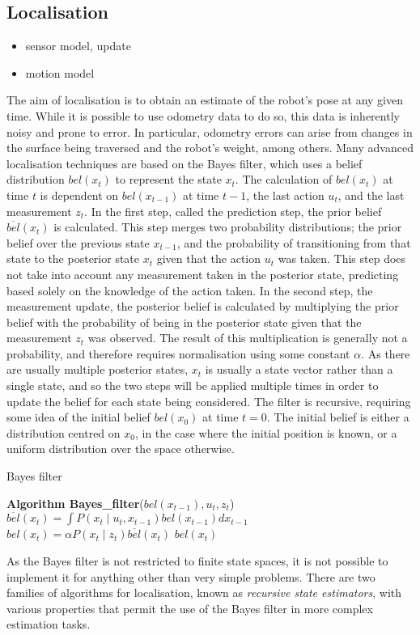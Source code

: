 \documentclass[conference]{IEEEtran}
\begin{document}
\subsection{Localisation}
\begin{itemize}
\item sensor model, update
\item motion model
\end{itemize}
The aim of localisation is to obtain an estimate of the robot's pose at any given time. While it is possible to use odometry data to do so, this data is inherently noisy and prone to error. In particular, odometry errors can arise from changes in the surface being traversed and the robot's weight, among others. Many advanced localisation techniques are based on the Bayes filter, which uses a belief distribution $bel(x_t)$ to represent the state $x_t$. The calculation of $bel(x_t)$ at time $t$ is dependent on $bel(x_{t-1})$ at time $t-1$, the last action $u_t$, and the last measurement $z_t$. In the first step, called the prediction step, the prior belief $\overline{bel}(x_t)$ is calculated. This step merges two probability distributions; the prior belief over the previous state $x_{t-1}$, and the probability of transitioning from that state to the posterior state $x_t$ given that the action $u_t$ was taken. This step does not take into account any measurement taken in the posterior state, predicting based solely on the knowledge of the action taken. In the second step, the measurement update, the posterior belief is calculated by multiplying the prior belief with the probability of being in the posterior state given that the measurement $z_t$ was observed. The result of this multiplication is generally not a probability, and therefore requires normalisation using some constant $\alpha$. As there are usually multiple posterior states, $x_t$ is usually a state vector rather than a single state, and so the two steps will be applied multiple times in order to update the belief for each state being considered. The filter is recursive, requiring some idea of the initial belief $bel(x_0)$ at time $t=0$. The initial belief is either a distribution centred on $x_0$, in the case where the initial position is known, or a uniform distribution over the space otherwise.
\begin{algorithm}
  \caption{Bayes filter\cite{thrun}}
  \label{alg:bayesfilter}
  \begin{algorithmic}[1]
        \State \textbf{Algorithm Bayes\_filter}\textnormal{($bel(x_{t-1}), u_t, z_t$)}
        \State $\overline{bel}(x_t)=\int P(x_t\mid u_t, x_{t-1})bel(x_{t-1})dx_{t-1}$
        \State $bel(x_t)=\alpha P(x_t \mid z_t)\overline{bel}(x_t)$
        \EndFor
        \State \Return $bel(x_t)$
  \end{algorithmic}
\end{algorithm}
As the Bayes filter is not restricted to finite state spaces, it is not possible to implement it for anything other than very simple problems. There are two families of algorithms for localisation, known as \emph{recursive state estimators}, with various properties that permit the use of the Bayes filter in more complex estimation tasks.
\end{document}
